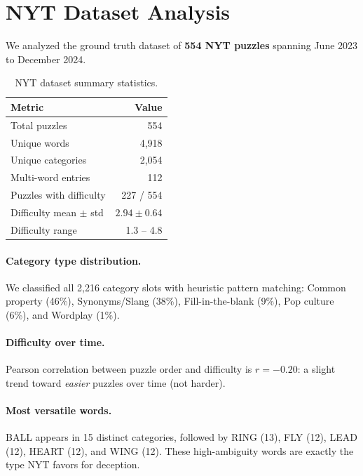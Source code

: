 \documentclass[11pt]{article}
\begin{document}
\section{NYT Dataset Analysis}

We analyzed the ground truth dataset of \textbf{554 NYT puzzles} spanning
June 2023 to December 2024.

\begin{table}[h]
\centering
\caption{NYT dataset summary statistics.}
\begin{tabular}{@{}lr@{}}
\toprule
Metric & Value \\
\midrule
Total puzzles               & 554 \\
Unique words                & 4,918 \\
Unique categories           & 2,054 \\
Multi-word entries           & 112 \\
Puzzles with difficulty      & 227 / 554 \\
Difficulty mean $\pm$ std   & $2.94 \pm 0.64$ \\
Difficulty range             & 1.3 -- 4.8 \\
\bottomrule
\end{tabular}
\end{table}

\paragraph{Category type distribution.}
We classified all 2,216 category slots with heuristic pattern matching:
Common property (46\%), Synonyms/Slang (38\%), Fill-in-the-blank (9\%),
Pop culture (6\%), and Wordplay (1\%).

\paragraph{Difficulty over time.}
Pearson correlation between puzzle order and difficulty is $r = -0.20$:
a slight trend toward \emph{easier} puzzles over time (not harder).

\paragraph{Most versatile words.}
BALL appears in 15 distinct categories, followed by RING (13), FLY (12),
LEAD (12), HEART (12), and WING (12). These high-ambiguity words are exactly
the type NYT favors for deception.
\end{document}
